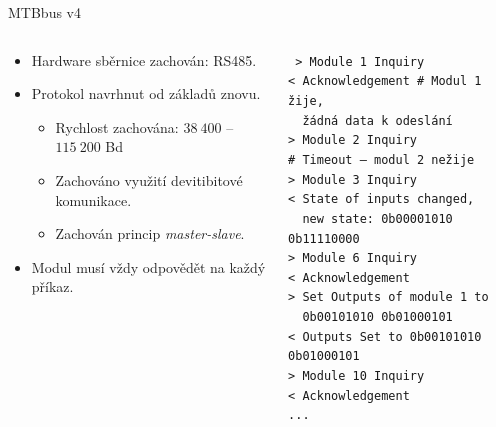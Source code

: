 \documentclass[aspectratio=169]{beamer}
\begin{document}
\begin{frame}{MTBbus v4}
\begin{columns}
	\begin{column}{.5\textwidth}
		\begin{itemize}
		\item Hardware sběrnice zachován: RS485.
		\item Protokol navrhnut od základů znovu.
		\begin{itemize}
			\item Rychlost zachována: $38\ 400$ – $115\ 200$ Bd
			\item Zachováno využití devitibitové komunikace.
			\item Zachován princip \textit{master-slave}.
		\end{itemize}
		\item Modul musí vždy odpovědět na každý příkaz.
		\end{itemize}
	\end{column}
	\pause
	\begin{column}{.5\textwidth}\texttt{\footnotesize
> Module 1 Inquiry \\
< Acknowledgement  \# Modul 1 žije, \\
  žádná data k odeslání \\
> Module 2 Inquiry \\
\# Timeout – modul 2 nežije \\
> Module 3 Inquiry \\
< State of inputs changed, \\
  new state: 0b00001010 0b11110000 \\
> Module 6 Inquiry \\
< Acknowledgement \\
> Set Outputs of module 1 to\\
  0b00101010 0b01000101 \\
< Outputs Set to 0b00101010 0b01000101 \\
> Module 10 Inquiry \\
< Acknowledgement \\
...}
	\end{column}
\end{columns}
\end{frame}

\end{document}
